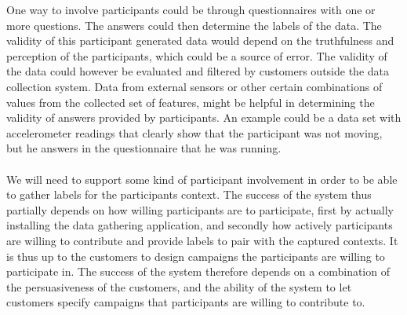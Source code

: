 \newpage
One way to involve participants could be through questionnaires with one or more questions. The answers could then determine the labels of the data. The validity of this participant generated data would depend on the truthfulness and perception of the participants, which could be a source of error. The validity of the data could however be evaluated and filtered by customers outside the data collection system. Data from external sensors or other certain combinations of values from the collected set of features, might be helpful in determining the validity of answers provided by participants. An example could be a data set with accelerometer readings that clearly show that the participant was not moving, but he answers in the questionnaire that he was running. 
\\\\
We will need to support some kind of participant involvement in order to be able to gather labels for the participants context. The success of the system thus partially depends on how willing participants are to participate, first by actually installing the data gathering application, and secondly how actively participants are willing to contribute and provide labels to pair with the captured contexts. It is thus up to the customers to design campaigns the participants are willing to participate in. The success of the system therefore depends on a combination of the persuasiveness of the customers, and the ability of the system to let customers specify campaigns that participants are willing to contribute to.
